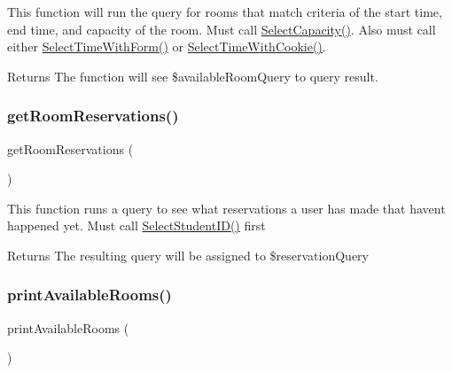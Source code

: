 This function will run the query for rooms that match criteria of the start time, end time, and capacity of the room. Must call \mbox{\hyperlink{_room___selection_8class_8php_a76636000b94ea99486d48b0cf946430a}{Select\+Capacity()}}. Also must call either \mbox{\hyperlink{_room___selection_8class_8php_a2fa31ac8825981cc1c7b9e0ae2882b15}{Select\+Time\+With\+Form()}} or \mbox{\hyperlink{_room___selection_8class_8php_a0df97fd941faa49c5932879ede080944}{Select\+Time\+With\+Cookie()}}. \begin{DoxyReturn}{Returns}
The function will see \$available\+Room\+Query to query result. 
\end{DoxyReturn}
\mbox{\label{_room___selection_8class_8php_ade932fe6af13dca6fad6841780807039}} 
\subsubsection{\texorpdfstring{getRoomReservations()}{getRoomReservations()}}
{\footnotesize\ttfamily get\+Room\+Reservations (\begin{DoxyParamCaption}{ }\end{DoxyParamCaption})}

This function runs a query to see what reservations a user has made that haven\textquotesingle{}t happened yet. Must call \mbox{\hyperlink{_room___selection_8class_8php_a1014e84155fb117997cf11fcab3c3d22}{Select\+Student\+I\+D()}} first \begin{DoxyReturn}{Returns}
The resulting query will be assigned to \$reservation\+Query 
\end{DoxyReturn}
\mbox{\label{_room___selection_8class_8php_af4a06b6f962b7a3a2c23568743295670}} 
\subsubsection{\texorpdfstring{printAvailableRooms()}{printAvailableRooms()}}
{\footnotesize\ttfamily print\+Available\+Rooms (\begin{DoxyParamCaption}{ }\end{DoxyParamCaption})}

